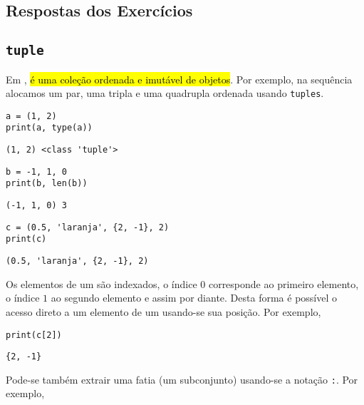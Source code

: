 \ifisbook 
\subsection*{Respostas dos Exercícios}
\shipoutAnswer
\fi


\subsection{\texttt{tuple}}

Em {\python}, \hl{{\PYTHONtuple} é uma coleção ordenada e imutável de objetos}. Por exemplo, na sequência alocamos um par, uma tripla e uma quadrupla ordenada usando \texttt{tuples}.

\begin{lstlisting}
a = (1, 2)
print(a, type(a))
\end{lstlisting}

\begin{verbatim}
(1, 2) <class 'tuple'>
\end{verbatim}

\begin{lstlisting}
b = -1, 1, 0
print(b, len(b))
\end{lstlisting}

\begin{verbatim}
(-1, 1, 0) 3
\end{verbatim}

\begin{lstlisting}
c = (0.5, 'laranja', {2, -1}, 2)
print(c)
\end{lstlisting}

\begin{verbatim}
(0.5, 'laranja', {2, -1}, 2)
\end{verbatim}

Os elementos de um {\PYTHONtuple} são indexados, o índice $0$ corresponde ao primeiro elemento, o índice $1$ ao segundo elemento e assim por diante. Desta forma é possível o acesso direto a um elemento de um {\PYTHONtuple} usando-se sua posição. Por exemplo,

\begin{lstlisting}
print(c[2])
\end{lstlisting}

\begin{verbatim}
{2, -1}
\end{verbatim}

Pode-se também extrair uma fatia (um subconjunto) usando-se a notação
\texttt{:}. Por exemplo,

